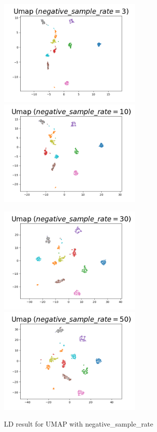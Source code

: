 \begin{figure}[H]
\centering  %
{
\label{Fig.sub.1}
\includegraphics[width=7cm,height=4cm\textwidth]{images/umap/umap_neg_3.png}}
{
\label{Fig.sub.2}
\includegraphics[width=7cm,height=4cm\textwidth]{images/umap/umap_neg_10.png}}

\centering  %
{
\label{Fig.sub.1}
\includegraphics[width=7cm,height=4cm\textwidth]{images/umap/umap_neg_30.png}}
{
\label{Fig.sub.2}
\includegraphics[width=7cm,height=4cm\textwidth]{images/umap/umap_neg_50.png}}
\caption{LD result for UMAP with negative\_sample\_rate}
\end{figure}

